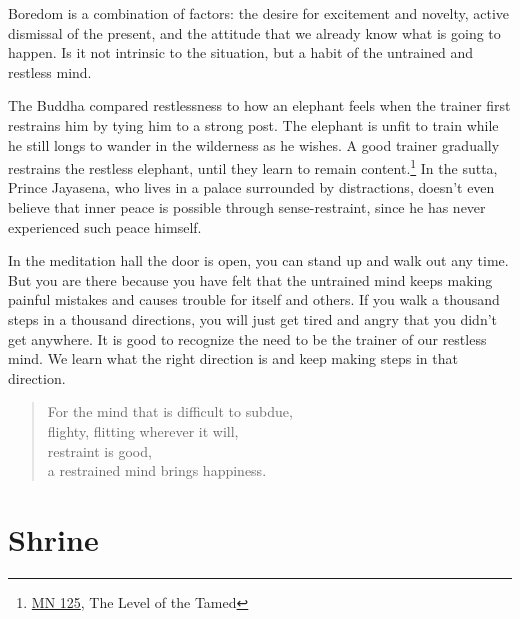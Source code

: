 Boredom is a combination of factors: the desire for excitement and
novelty, active dismissal of the present, and the attitude that we
already know what is going to happen. Is it not intrinsic to the
situation, but a habit of the untrained and restless mind.

The Buddha compared restlessness to how an elephant feels when the
trainer first restrains him by tying him to a strong post. The elephant
is unfit to train while he still longs to wander in the wilderness as he
wishes. A good trainer gradually restrains the restless elephant, until
they learn to remain content.\footnote{\href{https://suttacentral.net/mn125}{MN
  125}, The Level of the Tamed} In the sutta, Prince Jayasena, who lives
in a palace surrounded by distractions, doesn't even believe that inner
peace is possible through sense-restraint, since he has never
experienced such peace himself.

\enlargethispage*{\baselineskip}

In the meditation hall the door is open, you can stand up and walk out
any time. But you are there because you have felt that the untrained
mind keeps making painful mistakes and causes trouble for itself and
others. If you walk a thousand steps in a thousand directions, you will
just get tired and angry that you didn't get anywhere. It is good to
recognize the need to be the trainer of our restless mind. We learn what
the right direction is and keep making steps in that direction.

\begin{quote}
For the mind that is difficult to subdue,\\
flighty, flitting wherever it will,\\
restraint is good,\\
a restrained mind brings happiness.

\bigskip

\end{quote}

\section{Shrine}


